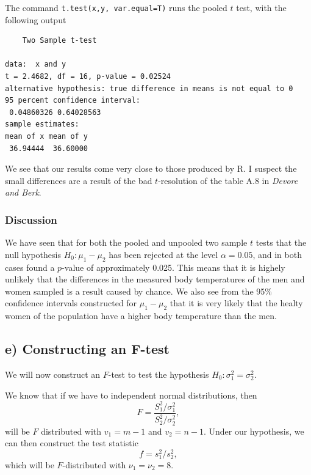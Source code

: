 \documentclass[a4paper, 11pt, titlepage]{article}
\begin{document}
The command \verb+t.test(x,y, var.equal=T)+ runs the pooled $t$ test, with the following output

\begin{lstlisting}
	Two Sample t-test

data:  x and y
t = 2.4682, df = 16, p-value = 0.02524
alternative hypothesis: true difference in means is not equal to 0
95 percent confidence interval:
 0.04860326 0.64028563
sample estimates:
mean of x mean of y 
 36.94444  36.60000 
\end{lstlisting}

We see that our results come very close to those produced by R. I suspect the small differences are a result of the bad $t$-resolution of the table A.8 in \emph{Devore and Berk}.

\subsubsection*{Discussion}

We have seen that for both the pooled and unpooled two sample $t$ tests that the null hypothesis $H_0: \mu_1 - \mu_2$ has been rejected at the level $\alpha = 0.05$, and in both cases found a $p$-value of approximately 0.025. This means that it is highely unlikely that the differences in the measured body temperatures of the men and women sampled is a result caused by chance. We also see from the 95\% confidence intervals constructed for $\mu_1 - \mu_2$ that it is very likely that the healty women of the population have a higher body temperature than the men.

\clearpage

\subsection*{e) Constructing an F-test}

We will now construct an $F$-test to test the hypothesis $H_0: \sigma_1^2 = \sigma_2^2$.

We know that if we have to independent normal distributions, then
$$F = \frac{S_1^2/\sigma_1^2}{S_2^2/\sigma_2^2},$$
will be $F$ distributed with $v_1 = m-1$ and $v_2 = n-1$. Under our hypothesis, we can then construct the test statistic
$$f = s_1^2/s_2^2,$$
which will be $F$-distributed with $\nu_1 = \nu_2 = 8$.
\end{document}
